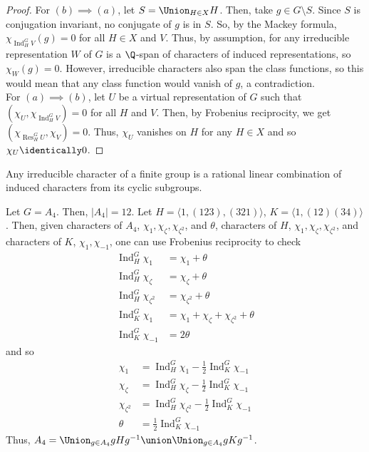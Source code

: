 \documentclass[11pt,leqno,oneside]{amsbook}
\newcommand{\Res}{\operatorname{Res}}
\newcommand{\Ind}{\operatorname{Ind}}
\numberwithin{thm}{section}
\begin{document}
\begin{proof}
  For \((b) \implies (a)\), let \(S = \Union_{H \in X} H\). Then, take
  \(g \in G \setminus S\). Since \(S\) is conjugation invariant, no
  conjugate of \(g\) is in \(S\). So, by the Mackey formula,
  \(\chi_{\Ind_H^G V}(g) = 0\) for all \(H \in X\) and \(V\). Thus,
  by assumption, for any irreducible representation \(W\) of \(G\) is
  a \(\Q\)-span of characters of induced representations, so
  \(\chi_W(g) = 0\). However, irreducible characters also span the
  class functions, so this would mean that any class function would
  vanish of \(g\), a contradiction. \\

  For \((a) \implies (b)\), let \(U\) be a virtual representation of
  \(G\) such that \((\chi_U, \chi_{\Ind_H^G V}) = 0\) for all \(H\)
  and \(V\). Then, by Frobenius reciprocity, we get \((\chi_{\Res_H^G
    U}, \chi_V) = 0\). Thus, \(\chi_U\) vanishes on \(H\) for any \(H
  \in X\) and so \(\chi_U \identically 0\). 
\end{proof}
\begin{cor}
  Any irreducible character of a finite group is a rational linear
  combination of induced characters from its cyclic subgroups.
\end{cor}
\begin{example}
  Let \(G = A_4\). Then, \(|A_4| = 12\). Let \(H = \langle 1,
  (123),(321) \rangle\), \(K = \langle 1, (12)(34) \rangle\). Then,
  given characters of \(A_4\), \(\chi_1, \chi_{\zeta},
  \chi_{\zeta^2}\), and \(\theta\), characters of \(H\), \(\chi_1,
  \chi_{\zeta}, \chi_{\zeta^2}\), and characters of \(K\), \(\chi_1,
  \chi_{-1}\), one can use Frobenius reciprocity 
  to check
  \begin{align*}
    \Ind_H^G \chi_1 & = \chi_1 + \theta \\
    \Ind_H^G \chi_{\zeta} & = \chi_{\zeta} + \theta \\
    \Ind_H^G \chi_{\zeta^2} & = \chi_{\zeta^2} + \theta \\
    \Ind_K^G \chi_1 & = \chi_1 + \chi_{\zeta} + \chi_{\zeta^2} + \theta \\
    \Ind_K^G \chi_{-1} & = 2 \theta
  \end{align*}
  and so
  \begin{align*}
    \chi_1 & = \Ind_H^G \chi_1 - \frac{1}{2} \Ind_K^G \chi_{-1} \\
    \chi_\zeta & = \Ind_H^G \chi_\zeta - \frac{1}{2} \Ind_K^G
                 \chi_{-1} \\
    \chi_{\zeta^2} & = \Ind_H^G \chi_{\zeta^2} - \frac{1}{2} \Ind_K^G
                     \chi_{-1} \\
    \theta & = \frac{1}{2} \Ind_K^G \chi_{-1}
  \end{align*}
  Thus, \(A_4 = \Union_{g \in A_4} gHg^{-1} \union \Union_{g \in A_4} gKg^{-1}\).
\end{example}
\end{document}
